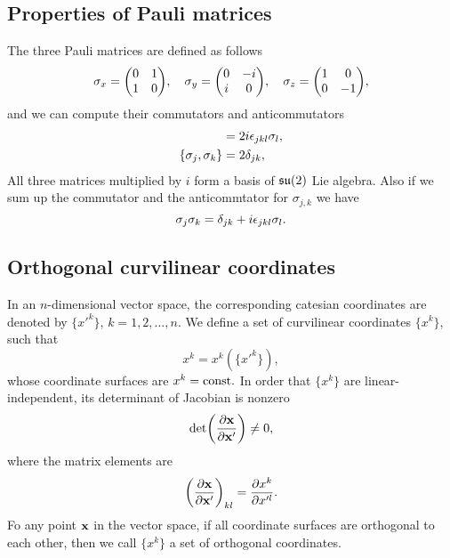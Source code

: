 \documentclass[10pt]{article}
\begin{document}
	\subsection{Properties of Pauli matrices}

	The three Pauli matrices are defined as follows
	\begin{equation}
		\sigma_x = \mqty(\pmat{1}), \quad \sigma_y = \mqty(\pmat{2}), \quad \sigma_z = \mqty(\pmat{3}),
	\end{equation}
	and we can compute their commutators and anticommutators
	\begin{align}
		[\sigma_j, \sigma_k] &= 2i \eps_{jkl} \sigma_l, \\
		\{ \sigma_j, \sigma_k \} &= 2 \delta_{jk},
	\end{align}
	All three matrices multiplied by $i$ form a basis of ${\mathfrak{s}}{\mathfrak{u}}(2)$ Lie algebra.
	Also if we sum up the commutator and the anticommtator for $\sigma_{j,k}$ we have
	\begin{equation}
		\sigma_j \sigma_k = \delta_{jk} + i \epsilon_{jkl} \sigma_l.
	\end{equation}

	\subsection{Orthogonal curvilinear coordinates}

	In an $n$-dimensional vector space, the corresponding catesian coordinates are denoted by $\{ x'^k \}$, $k = 1,2, \dots, n$. We define a set of curvilinear coordinates $\{ x^k \}$, such that
	\begin{equation}
		x^k = x^k( \{ x'^k \} ),
	\end{equation}
	whose coordinate surfaces are $x^k = {\mathrm{const.}}$ In order that $\{ x^k \}$ are linear-independent, its determinant of Jacobian is nonzero
	\begin{equation}
		\det(\pdv{{\bf x}}{{\bf x}'}) \neq 0,
	\end{equation}
	where the matrix elements are
	\begin{equation}
		\pqty{\pdv{\bfx}{\bfx'}}_{k l} = \pdv{x^k}{x'^l}.
	\end{equation}
	Fo any point ${\bf x}$ in the vector space, if all coordinate surfaces are orthogonal to each other, then we call $\{ x^k \}$ a set of orthogonal coordinates.
\end{document}
